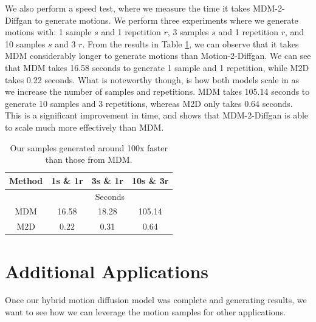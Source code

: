 \documentclass[10pt,twocolumn,letterpaper]{article}
\begin{document}
\newpage

We also perform a speed test, where we measure the time it takes MDM-2-Diffgan to generate motions. We perform 
three experiments where we generate motions with: 1 sample $s$ and 1 repetition $r$, 3 samples $s$ and 1 repetition $r$, and 10 samples 
$s$ and 3 $r$. From the results in Table \ref{tab:time}, we can observe that it takes MDM considerably longer to generate motions 
than Motion-2-Diffgan. We can see that MDM takes 16.58 seconds to generate 1 sample and 1 repetition, while M2D takes 0.22 seconds. 
What is noteworthy though, is how both models scale in as we increase the number of samples and repetitions. MDM takes 105.14 seconds 
to generate 10 samples and 3 repetitions, whereas M2D only takes 0.64 seconds. This is a significant improvement in time, and shows that 
MDM-2-Diffgan is able to scale much more effectively than MDM. 

\begin{table}[]
    \centering
    \begin{tabular}{|c|ccc|}
    \hline
    Method & \multicolumn{1}{c|}{1s \& 1r} & \multicolumn{1}{c|}{3s \& 1r} & 10s \& 3r \\ \hline
           & \multicolumn{3}{c|}{Seconds}                                              \\ \hline
    MDM    & \multicolumn{1}{c|}{16.58}    & \multicolumn{1}{c|}{18.28}    & 105.14    \\ \hline
    M2D    & \multicolumn{1}{c|}{0.22}     & \multicolumn{1}{c|}{0.31}     & 0.64      \\ \hline
    \end{tabular}
    \caption{Our samples generated around 100x faster than those from MDM.}
    \label{tab:time}
\end{table}

\newpage

\section{Additional Applications}
\label{sec:additional-applications}

Once our hybrid motion diffusion model was complete and generating results, we want to see how we can
leverage the motion samples for other applications. 
\end{document}
